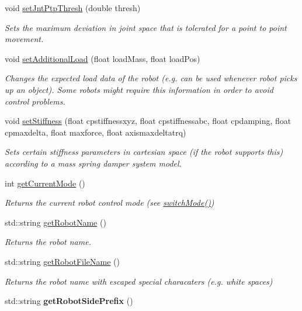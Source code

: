 \begin{DoxyCompactItemize}
\item 
void \hyperlink{classkukadu_1_1KukieControlQueue_ac6653c3a050bb338702294776b4a8065}{set\-Jnt\-Ptp\-Thresh} (double thresh)
\begin{DoxyCompactList}\small\item\em Sets the maximum deviation in joint space that is tolerated for a point to point movement. \end{DoxyCompactList}\item 
void \hyperlink{classkukadu_1_1KukieControlQueue_a0fef688170ac5a3e21df426a30ef0e77}{set\-Additional\-Load} (float load\-Mass, float load\-Pos)
\begin{DoxyCompactList}\small\item\em Changes the expected load data of the robot (e.\-g. can be used whenever robot picks up an object). Some robots might require this information in order to avoid control problems. \end{DoxyCompactList}\item 
void \hyperlink{classkukadu_1_1KukieControlQueue_a3145cfcb1dc4879e2e3f16ad4829ce09}{set\-Stiffness} (float cpstiffnessxyz, float cpstiffnessabc, float cpdamping, float cpmaxdelta, float maxforce, float axismaxdeltatrq)
\begin{DoxyCompactList}\small\item\em Sets certain stiffness parameters in cartesian space (if the robot supports this) according to a mass spring damper system model. \end{DoxyCompactList}\item 
int \hyperlink{classkukadu_1_1KukieControlQueue_aecd7cca5bf0b7dd990d061acdee56ce3}{get\-Current\-Mode} ()
\begin{DoxyCompactList}\small\item\em Returns the current robot control mode (see \hyperlink{classkukadu_1_1ControlQueue_a5defe63d9f1b9829676f9a31a4683911}{switch\-Mode()}) \end{DoxyCompactList}\item 
std\-::string \hyperlink{classkukadu_1_1KukieControlQueue_aa1edc1807aad2cf5f991c0a70fb2bc40}{get\-Robot\-Name} ()
\begin{DoxyCompactList}\small\item\em Returns the robot name. \end{DoxyCompactList}\item 
std\-::string \hyperlink{classkukadu_1_1KukieControlQueue_a390da7a21b5c9f42ceff914155499b76}{get\-Robot\-File\-Name} ()
\begin{DoxyCompactList}\small\item\em Returns the robot name with escaped special characaters (e.\-g. white spaces) \end{DoxyCompactList}\item 
\hypertarget{classkukadu_1_1KukieControlQueue_abab099320e0d9f4f6d68c784fcbfeb15}{std\-::string {\bfseries get\-Robot\-Side\-Prefix} ()}\label{classkukadu_1_1KukieControlQueue_abab099320e0d9f4f6d68c784fcbfeb15}


\end{DoxyCompactItemize}
